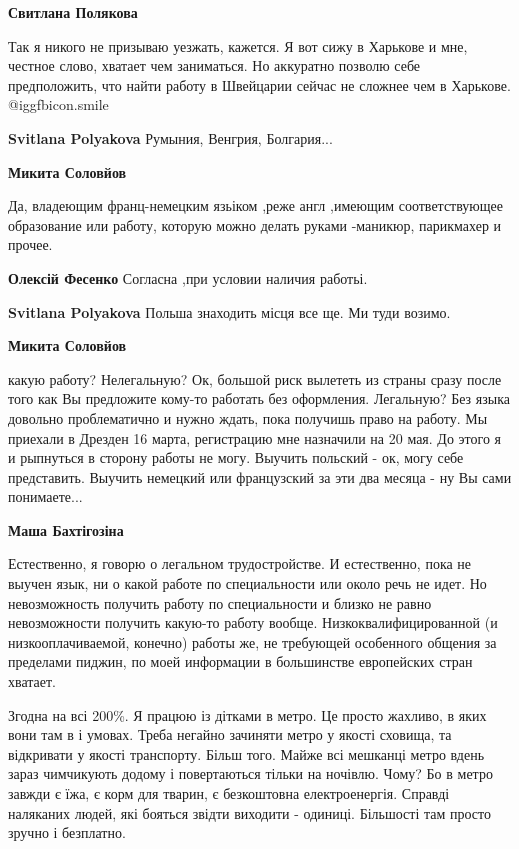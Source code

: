 \begin{itemize}
\begin{itemize}
\textbf{Свитлана Полякова} 

Так я никого не призываю уезжать, кажется. Я вот сижу в Харькове и мне, честное
слово, хватает чем заниматься. Но аккуратно позволю себе предположить, что
найти работу в Швейцарии сейчас не сложнее чем в Харькове.  @igg{fbicon.smile} 

\textbf{Svitlana Polyakova} Румыния, Венгрия, Болгария...

\textbf{Микита Соловйов} 

Да, владеющим франц-немецким язьіком ,реже англ ,имеющим соответствующее
образование или работу, которую можно делать руками -маникюр, парикмахер и
прочее.

\textbf{Олексій Фесенко} Согласна ,при условии наличия работьі.

\textbf{Svitlana Polyakova} Польша знаходить місця все ще. Ми туди возимо.

\textbf{Микита Соловйов} 

какую работу? Нелегальную? Ок, большой риск вылететь из страны сразу после того
как Вы предложите кому-то работать без оформления. Легальную? Без языка
довольно проблематично и нужно ждать, пока получишь право на работу. Мы
приехали в Дрезден 16 марта, регистрацию мне назначили на 20 мая. До этого я и
рыпнуться в сторону работы не могу. Выучить польский - ок, могу себе
представить. Выучить немецкий или французский за эти два месяца - ну Вы сами
понимаете...

\textbf{Маша Бахтігозіна} 

Естественно, я говорю о легальном трудостройстве. И естественно, пока не выучен
язык, ни о какой работе по специальности или около речь не идет. Но
невозможность получить работу по специальности и близко не равно невозможности
получить какую-то работу вообще. Низкоквалифицированной (и низкооплачиваемой,
конечно) работы же, не требующей особенного общения за пределами пиджин, по
моей информации в большинстве европейских стран хватает.

\end{itemize} %


\obeycr
Згодна на всі 200\%.
Я працюю із дітками в метро.
Це просто жахливо, в яких вони там в і умовах.
Треба негайно зачиняти метро у якості сховища, та відкривати у якості транспорту.
Більш того.
Майже всі мешканці метро вдень зараз чимчикують додому і повертаються тільки на ночівлю.
Чому?
Бо в метро завжди є їжа, є корм для тварин, є безкоштовна електроенергія.
Справді наляканих людей, які бояться звідти виходити - одиниці.
Більшості там просто зручно і безплатно.
\restorecr


\end{itemize}
